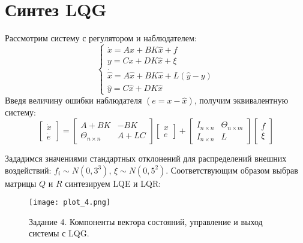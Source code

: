 \section{Синтез LQG}
Рассмотрим систему с регулятором и наблюдателем:
\begin{equation}
    \begin{cases}
        \dot{x} = Ax + BK\hat{x} + f \\
        y = Cx + DK\hat{x} + \xi \\
        \dot{\hat{x}} = A\hat{x} + BK\hat{x} + L(\hat{y}-y) \\
        \hat{y} = C\hat{x} + DK\hat{x}
    \end{cases}
\end{equation}
Введя величину ошибки наблюдателя $(e = x - \hat{x})$, получим эквивалентную систему:
\begin{equation}
    \begin{bmatrix}
        \dot{x} \\ \dot{e}
    \end{bmatrix} =
    \begin{bmatrix}
        A + BK & -BK \\
        \Theta_{n \times n} & A + LC
    \end{bmatrix}
    \begin{bmatrix}
        x \\ e
    \end{bmatrix} +
    \begin{bmatrix}
        I_{n \times n} & \Theta_{n \times m} \\
        I_{n \times n} & L
    \end{bmatrix}
    \begin{bmatrix}
        f \\ \xi
    \end{bmatrix}
\end{equation}

Зададимся значениями стандартных отклонений для распределений внешних воздействий: $f_i \sim N(0,3^3) $, $\xi \sim N(0,5^2)$.
Соответствующим образом выбрав матрицы $Q$ и $R$ синтезируем LQE и LQR:
\begin{figure}[h]
    \centering
    \texttt{[image: plot\_4.png]}
    \caption{\label{fig:The-caption-1}Задание 4. Компоненты вектора состояний, управление и выход системы с LQG.}
\end{figure}
\pagebreak

